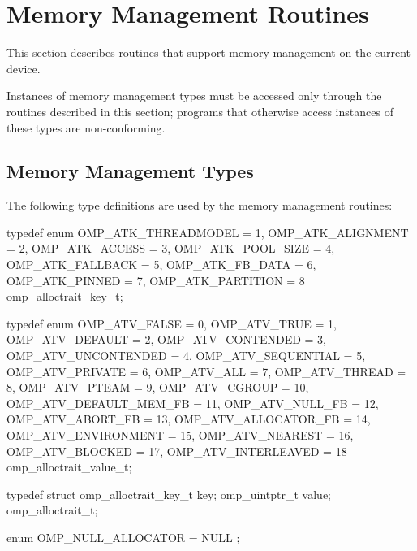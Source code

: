 
\section{Memory Management Routines}
\label{sec:Memory Management Routines}
This section describes routines that support memory management on the current device.

Instances of memory management types must be accessed only through 
the routines described in this section; programs that otherwise 
access instances of these types are non-conforming.



\subsection{Memory Management Types}
\label{subsec:Memory Management Types}

The following type definitions are used by the memory management routines:

\begin{ccppspecific}
\begin{ompEnv}
typedef enum {
  OMP_ATK_THREADMODEL = 1,
  OMP_ATK_ALIGNMENT = 2,
  OMP_ATK_ACCESS = 3,
  OMP_ATK_POOL_SIZE = 4,
  OMP_ATK_FALLBACK = 5,
  OMP_ATK_FB_DATA = 6,
  OMP_ATK_PINNED = 7,
  OMP_ATK_PARTITION = 8
} omp_alloctrait_key_t;

typedef enum {
  OMP_ATV_FALSE = 0,   
  OMP_ATV_TRUE = 1,    
  OMP_ATV_DEFAULT = 2,
  OMP_ATV_CONTENDED = 3,
  OMP_ATV_UNCONTENDED = 4,
  OMP_ATV_SEQUENTIAL = 5,
  OMP_ATV_PRIVATE = 6,
  OMP_ATV_ALL = 7,
  OMP_ATV_THREAD = 8,
  OMP_ATV_PTEAM = 9,
  OMP_ATV_CGROUP = 10,
  OMP_ATV_DEFAULT_MEM_FB = 11,
  OMP_ATV_NULL_FB = 12,
  OMP_ATV_ABORT_FB = 13,
  OMP_ATV_ALLOCATOR_FB = 14,
  OMP_ATV_ENVIRONMENT = 15,
  OMP_ATV_NEAREST = 16,
  OMP_ATV_BLOCKED = 17,
  OMP_ATV_INTERLEAVED = 18
} omp_alloctrait_value_t;

typedef struct {
  omp_alloctrait_key_t key;
  omp_uintptr_t value;
} omp_alloctrait_t;

enum { OMP_NULL_ALLOCATOR = NULL };
\end{ompEnv}
\end{ccppspecific}

